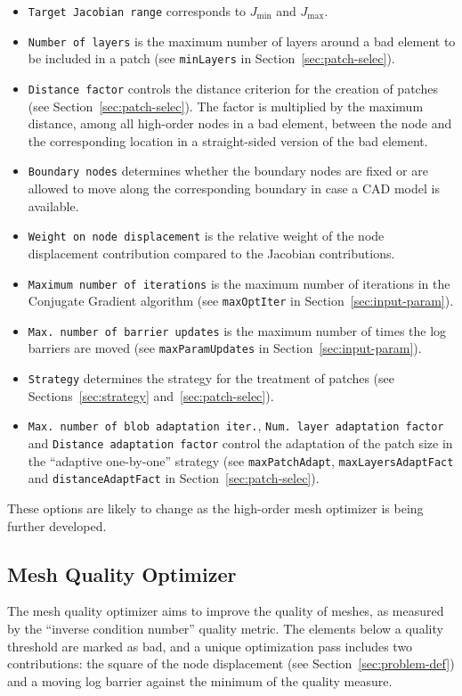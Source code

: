 \documentclass[12pt,a4paper,a4wide]{article}
\begin{document}
\begin{itemize}
\item \texttt{Target Jacobian range} corresponds to $J_{\min}$ and
$J_{\max}$.
\item \texttt{Number of layers} is the maximum number of layers
around a bad element to be included in a patch (see \texttt{minLayers}
in Section~\ref{sec:patch-selec}).
\item \texttt{Distance factor} controls the distance criterion
for the creation of patches (see Section~\ref{sec:patch-selec}). The
factor is multiplied by the maximum distance, among all high-order
nodes in a bad element, between the node and the corresponding location
in a straight-sided version of the bad element.
\item \texttt{Boundary nodes} determines whether the boundary nodes
are fixed or are allowed to move along the corresponding boundary
in case a CAD model is available.
\item \texttt{Weight on node displacement} is the relative weight
of the node displacement contribution compared to the Jacobian
contributions.
\item \texttt{Maximum number of iterations} is the maximum number
of iterations in the Conjugate Gradient algorithm (see
\texttt{maxOptIter} in Section~\ref{sec:input-param}).
\item \texttt{Max. number of barrier updates} is the maximum number
of times the log barriers are moved (see \texttt{maxParamUpdates} in
Section~\ref{sec:input-param}).
\item \texttt{Strategy} determines the strategy for the treatment of
patches (see Sections~\ref{sec:strategy} and~\ref{sec:patch-selec}).
\item \texttt{Max. number of blob adaptation iter.},
\texttt{Num. layer adaptation factor} and
\texttt{Distance adaptation factor} control the adaptation of the
patch size in the ``adaptive one-by-one'' strategy (see
\texttt{maxPatchAdapt}, \texttt{maxLayersAdaptFact} and
\texttt{distanceAdaptFact} in Section~\ref{sec:patch-selec}).
\end{itemize}

These options are likely to change as the high-order mesh
optimizer is being further developed.


\subsection{Mesh Quality Optimizer}

The mesh quality optimizer aims to improve the quality of meshes,
as measured by the ``inverse condition number'' quality metric.
The elements below a quality threshold are marked as bad, and a
unique optimization pass includes two contributions: the square
of the node displacement (see Section~\ref{sec:problem-def}) and
a moving log barrier against the minimum of the quality measure.
\end{document}
